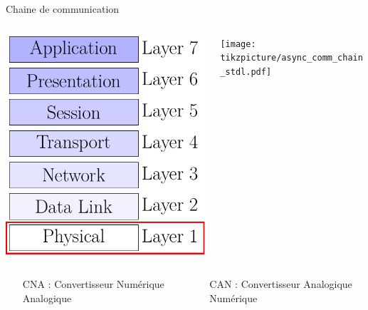 \documentclass[../main.tex]{subfiles}
\begin{document}
\begin{frame}{Chaine de communication}{} \centering \vspace{-1em}

  \begin{columns}
    \begin{column}{.15\linewidth} \centering
      \includegraphics[width=\linewidth]{figures/tikzpicture/osi_layers_stdl.pdf}
    \end{column}
    \begin{column}{.75\linewidth}
      \texttt{[image: tikzpicture/async\_comm\_chain\_stdl.pdf]}
    \end{column}
  \end{columns}


  \begin{columns} \small
    \begin{column}{.45\linewidth}
      \begin{itemize}
        \item [CNA :] Convertisseur Numérique Analogique
      \end{itemize}
    \end{column}
    \begin{column}{.45\linewidth}
      \begin{itemize}
        \item [CAN :] Convertisseur Analogique Numérique
      \end{itemize}
    \end{column}
  \end{columns}
\end{frame}
\end{document}
